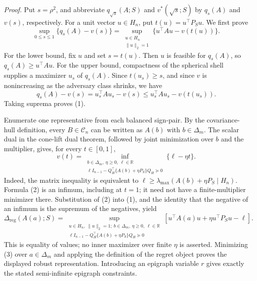 \textit{Proof.}
Put \(s=\rho^2\), and abbreviate \(q_{\sqrt{s}}(A;S)\) and \(v^*(\sqrt{s};S)\) by \(q_s(A)\) and \(v(s)\), respectively.  For a unit vector \(u\in H_n\), put \(t(u)=u^\top P_Su\).  We first prove
\[
\sup_{0\leq s\leq1}\{q_s(A)-v(s)\}
=\sup_{\substack{u\in H_n\\\|u\|_2=1}}
\{u^\top Au-v(t(u))\}.
\tag{1}
\]
For the lower bound, fix \(u\) and set \(s=t(u)\).  Then \(u\) is feasible for \(q_s(A)\), so \(q_s(A)\geq u^\top Au\).  For the upper bound, compactness of the spherical shell supplies a maximizer \(u_s\) of \(q_s(A)\).  Since \(t(u_s)\geq s\), and since \(v\) is nonincreasing as the adversary class shrinks, we have
\[
q_s(A)-v(s)
=u_s^\top Au_s-v(s)
\leq u_s^\top Au_s-v(t(u_s)).
\]
Taking suprema proves (1).

Enumerate one representative from each balanced sign-pair.  By the covariance-hull definition, every \(B\in\mathcal C_n\) can be written as \(A(b)\) with \(b\in\Delta_m\).  The scalar dual in the cone-lift dual theorem, followed by joint minimization over \(b\) and the multiplier, gives, for every \(t\in[0,1]\),
\[
v(t)=
\inf_{\substack{b\in\Delta_m,\ \eta\geq0,\ \ell\in\mathbb R\\
\ell I_{n-1}-Q_H^\top\{A(b)+\eta P_S\}Q_H\succeq0}}
\{\ell-\eta t\}.
\tag{2}
\]
Indeed, the matrix inequality is equivalent to
\(\ell\geq\lambda_{\max}(A(b)+\eta P_S\mid H_n)\).  Formula (2) is an infimum, including at \(t=1\); it need not have a finite-multiplier minimizer there.  Substitution of (2) into (1), and the identity that the negative of an infimum is the supremum of the negatives, yield
\[
\Delta_{\mathrm{reg}}(A(a);S)
=\sup_{\substack{u\in H_n,\ \|u\|_2=1;\ b\in\Delta_m,\ \eta\geq0,\ \ell\in\mathbb R\\
\ell I_{n-1}-Q_H^\top\{A(b)+\eta P_S\}Q_H\succeq0}}
\left[u^\top A(a)u+\eta u^\top P_Su-\ell\right].
\tag{3}
\]
This is equality of values; no inner maximizer over finite \(\eta\) is asserted.  Minimizing (3) over \(a\in\Delta_m\) and applying the definition of the regret object proves the displayed robust representation.  Introducing an epigraph variable \(r\) gives exactly the stated semi-infinite epigraph constraints.

